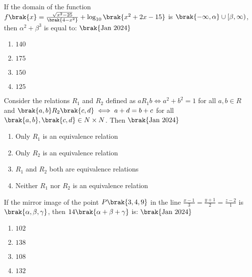 \item{
If the domain of the function $f\brak{x}=\frac{\sqrt{x^2-25}}{\brak{4-x^2}}+\log_{10}\brak{x^2+2x-15}$ is $\brak{-\infty,\alpha}\cup[\beta,\infty)$, then $\alpha ^2+\beta ^3$ is equal to:
\hfill{$\brak{\text{Jan 2024}}$}
\begin{multicols}{4}
\begin{enumerate}
\item $140$
\item $175$
\item $150$
\item $125$
\end{enumerate}
\end{multicols}
}
\item{
Consider the relations $R_1$ and $R_2$ defined as $aR_1b\iff a^2+b^2=1$ for all $a,b\in R$ and $\brak{a,b}R_2\brak{c,d}\iff a+d=b+c$ for all $\brak{a,b},\brak{c,d}\in N\times N$. Then
\hfill{$\brak{\text{Jan 2024}}$}
\begin{enumerate}
\item Only $R_1$ is an equivalence relation 
\item Only $R_2$ is an equivalence relation 
\item $R_1$ and $R_2$ both are equivalence relations
\item Neither $R_1$ nor $R_2$ is an equivalence relation
\end{enumerate}
}
\item{
If the mirror image of the point $P\brak{3,4,9}$ in the line $\frac{x-1}{3}=\frac{y+1}{2}=\frac{z-2}{1}$ is $\brak{\alpha,\beta,\gamma}$, then $14\brak{\alpha+\beta+\gamma}$ is:
\hfill{$\brak{\text{Jan 2024}}$}
\begin{multicols}{4}
\begin{enumerate}
\item $102$
\item $138$
\item $108$
\item $132$
\end{enumerate}
\end{multicols}
}

